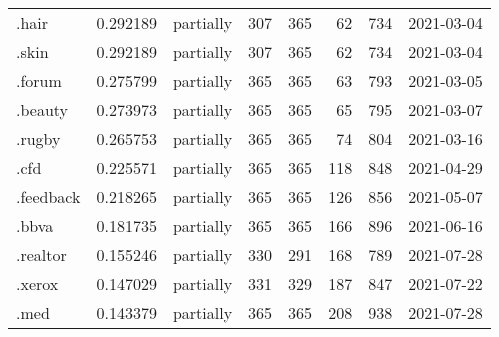 \begin{tabular}{lrlrrrrl}
.hair                     &          0.292189 &       partially &                         307 &                         365 &                          62 &                 734 &           2021-03-04 \\
.skin                     &          0.292189 &       partially &                         307 &                         365 &                          62 &                 734 &           2021-03-04 \\
.forum                    &          0.275799 &       partially &                         365 &                         365 &                          63 &                 793 &           2021-03-05 \\
.beauty                   &          0.273973 &       partially &                         365 &                         365 &                          65 &                 795 &           2021-03-07 \\
.rugby                    &          0.265753 &       partially &                         365 &                         365 &                          74 &                 804 &           2021-03-16 \\
.cfd                      &          0.225571 &       partially &                         365 &                         365 &                         118 &                 848 &           2021-04-29 \\
.feedback                 &          0.218265 &       partially &                         365 &                         365 &                         126 &                 856 &           2021-05-07 \\
.bbva                     &          0.181735 &       partially &                         365 &                         365 &                         166 &                 896 &           2021-06-16 \\
.realtor                  &          0.155246 &       partially &                         330 &                         291 &                         168 &                 789 &           2021-07-28 \\
.xerox                    &          0.147029 &       partially &                         331 &                         329 &                         187 &                 847 &           2021-07-22 \\
.med                      &          0.143379 &       partially &                         365 &                         365 &                         208 &                 938 &           2021-07-28 \\

\end{tabular}
